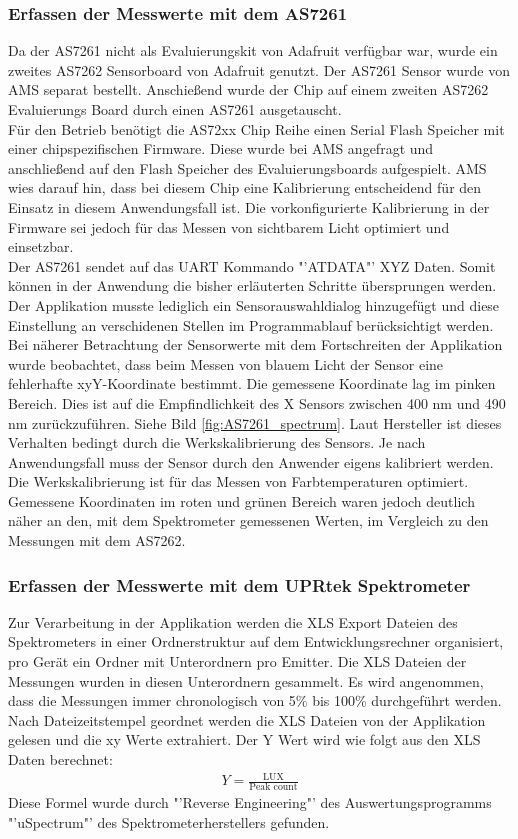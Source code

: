 \documentclass[11pt]{scrartcl}
\begin{document}
\subsubsection{Erfassen der Messwerte mit dem AS7261} \label{measuringWith7261}
Da der AS7261 nicht als Evaluierungskit von Adafruit verfügbar war, wurde ein zweites AS7262 Sensorboard von Adafruit genutzt. Der AS7261 Sensor
wurde von AMS separat bestellt. Anschießend wurde der Chip auf einem zweiten AS7262 Evaluierungs Board durch einen AS7261 ausgetauscht.\\
Für den Betrieb benötigt die AS72xx Chip Reihe einen Serial Flash Speicher mit einer chipspezifischen Firmware. Diese wurde bei AMS angefragt
und anschließend auf den Flash Speicher des Evaluierungsboards aufgespielt. AMS wies darauf hin, dass bei diesem Chip eine Kalibrierung entscheidend
für den Einsatz in diesem Anwendungsfall ist. Die vorkonfigurierte Kalibrierung in der Firmware sei jedoch für das Messen von sichtbarem Licht
optimiert und einsetzbar.\\
Der AS7261 sendet auf das UART Kommando "'ATDATA"' XYZ Daten. Somit können in der Anwendung die bisher erläuterten Schritte übersprungen werden.
Der Applikation musste lediglich ein Sensorauswahldialog hinzugefügt und diese Einstellung an verschidenen Stellen im Programmablauf
berücksichtigt werden.\\
Bei näherer Betrachtung der Sensorwerte mit dem Fortschreiten der Applikation wurde beobachtet, dass beim Messen von blauem Licht der Sensor
eine fehlerhafte xyY-Koordinate bestimmt. Die gemessene Koordinate lag im pinken Bereich. Dies ist auf die Empfindlichkeit des X Sensors zwischen
400 nm und 490 nm zurückzuführen. Siehe Bild \ref{fig:AS7261_spectrum}. Laut Hersteller ist dieses Verhalten bedingt durch die Werkskalibrierung
des Sensors. Je nach Anwendungsfall muss der Sensor durch den Anwender eigens kalibriert werden. Die Werkskalibrierung ist für das Messen von
Farbtemperaturen optimiert.\\
Gemessene Koordinaten im roten und grünen Bereich waren jedoch deutlich näher an den, mit dem Spektrometer gemessenen Werten, im Vergleich zu
den Messungen mit dem AS7262.
\subsubsection{Erfassen der Messwerte mit dem UPRtek Spektrometer}
Zur Verarbeitung in der Applikation werden die XLS Export Dateien des Spektrometers in einer Ordnerstruktur auf dem Entwicklungsrechner organisiert,
pro Gerät ein Ordner mit Unterordnern pro Emitter. Die XLS Dateien der Messungen wurden in diesen Unterordnern gesammelt. Es wird angenommen, dass die
Messungen immer chronologisch von 5\% bis 100\% durchgeführt werden. Nach Dateizeitstempel geordnet werden die XLS Dateien von der Applikation gelesen
und die xy Werte extrahiert. Der Y Wert wird wie folgt aus den XLS Daten berechnet:
\begin{align}\label{Equ:23}
    Y = \frac{\text{LUX}}{\text{Peak count}}
\end{align}
Diese Formel wurde durch "'Reverse Engineering"' des Auswertungsprogramms "'uSpectrum"' des Spektrometerherstellers gefunden.
\end{document}
